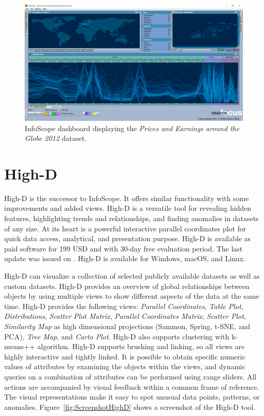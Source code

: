\begin{figure}[tp]
\centering
\includegraphics[keepaspectratio,width=\linewidth,height=\halfh]
{images/screenshot-infoscope.png}

\caption[InfoScope Dashboard Screenshot]
{%
InfoScope dashboard displaying the \emph{Prices and Earnings around the Globe 2012} dataset.
}
\label{fig:ScreenshotInfoScope}
\end{figure}




\section{High-D}

High-D \parencite{HighD} is the successor to InfoScope. It offers similar
functionality with some improvements and added views. High-D is a versatile tool
for revealing hidden features, highlighting trends and relationships, and
finding anomalies in datasets of any size. At its heart is a powerful
interactive parallel coordinates plot for quick data access, analytical, and
presentation purpose. High-D is available as paid software for 199 USD and with
30-day free evaluation period. The last update was issued on
. High-D is available for Windows, macOS, and Linux.


High-D can visualize a collection of selected publicly available
datasets as well as custom datasets. High-D provides an overview of
global relationships between objects by using multiple views to show
different aspects of the data at the same time. High-D provides the
following views: \emph{Parallel Coordinates}, \emph{Table Plot},
\emph{Distributions}, \emph{Scatter Plot Matrix}, \emph{Parallel
Coordinates Matrix}, \emph{Scatter Plot}, \emph{Similarity Map} as
high dimensional projections (Sammon, Spring, t-SNE, and PCA),
\emph{Tree Map}, and \emph{Carto Plot}. High-D also supports
clustering with k-means++ algorithm. High-D supports brushing and
linking, so all views are highly interactive and tightly linked. It is
possible to obtain specific numeric values of attributes by examining
the objects within the views, and dynamic queries on a combination of
attributes can be performed using range sliders. All actions are
accompanied by visual feedback within a common frame of reference. The
visual representations make it easy to spot unusual data points,
patterns, or anomalies. Figure~\ref{fig:ScreenshotHighD} shows a
screenshot of the High-D tool.




